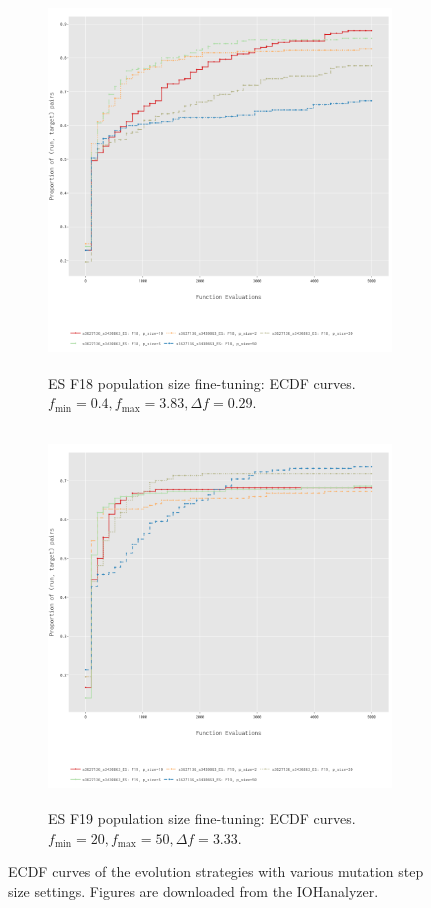 \documentclass{article}
\begin{document}
\begin{figure}[!ht]
    \centering
    \begin{subfigure}[h]{0.95\linewidth}
        \includegraphics[width=\linewidth, height=10cm]{es/f18/ECDF18ps.png}
        \caption{ES F18 population size fine-tuning: ECDF curves. $f_{\min} = 0.4, f_{\max} = 3.83, \Delta f = 0.29$.}
    \end{subfigure}
    \hfill
    \begin{subfigure}[h]{0.95\linewidth}
        \includegraphics[width=\linewidth, height=10cm]{es/f19/ECDF19ps.png}
        \caption{ES F19 population size fine-tuning: ECDF curves. $f_{\min} = 20, f_{\max} = 50, \Delta f = 3.33$.}
    \end{subfigure}
    \caption{ECDF curves of the evolution strategies with various mutation step size settings. Figures are downloaded from the IOHanalyzer.}
    \label{fig:experi-es-psize-ecdf}
\end{figure}
\end{document}
